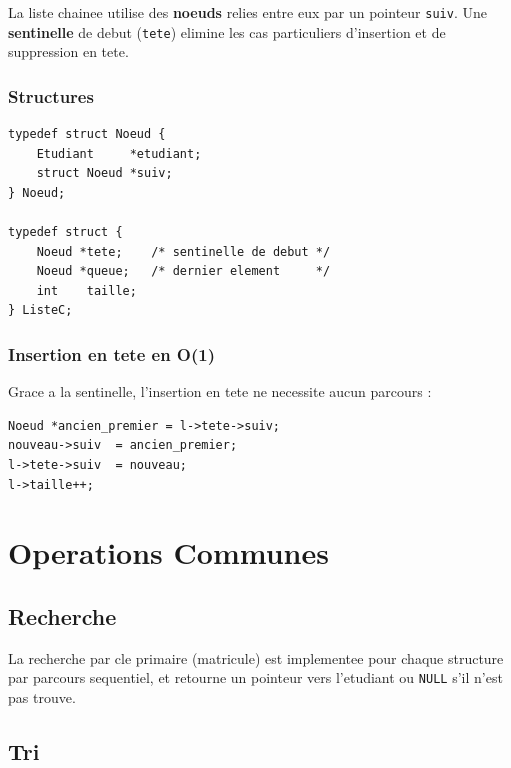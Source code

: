 \documentclass[12pt,a4paper]{article}
\begin{document}
La liste chainee utilise des \textbf{noeuds} relies entre eux par un
pointeur \texttt{suiv}. Une \textbf{sentinelle} de debut (\texttt{tete})
elimine les cas particuliers d'insertion et de suppression en tete.

\subsubsection{Structures}

\begin{lstlisting}[caption={Structures Noeud et ListeC}]
typedef struct Noeud {
    Etudiant     *etudiant;
    struct Noeud *suiv;
} Noeud;

typedef struct {
    Noeud *tete;    /* sentinelle de debut */
    Noeud *queue;   /* dernier element     */
    int    taille;
} ListeC;
\end{lstlisting}

\subsubsection{Insertion en tete en O(1)}

Grace a la sentinelle, l'insertion en tete ne necessite aucun parcours :

\begin{lstlisting}[caption={Insertion en tete O(1)}]
Noeud *ancien_premier = l->tete->suiv;
nouveau->suiv  = ancien_premier;
l->tete->suiv  = nouveau;
l->taille++;
\end{lstlisting}

\section{Operations Communes}

\subsection{Recherche}

La recherche par cle primaire (matricule) est implementee pour chaque
structure par parcours sequentiel, et retourne un pointeur vers
l'etudiant ou \texttt{NULL} s'il n'est pas trouve.

\subsection{Tri}
\end{document}
